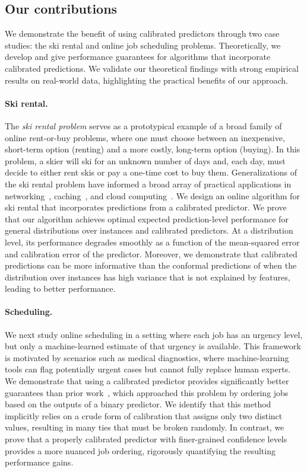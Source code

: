 \subsection{Our contributions}
We demonstrate the benefit of using calibrated predictors through two case studies: the ski rental and online job scheduling problems. Theoretically, we develop and give performance guarantees for algorithms that incorporate calibrated predictions. We validate our theoretical findings with strong empirical results on real-world data, highlighting the practical benefits of our approach.

\paragraph{Ski rental.}
The \emph{ski rental problem} serves as a prototypical example of a broad family of online rent-or-buy problems, where one must choose between an inexpensive, short-term option (renting) and a more costly, long-term option (buying). In this problem, a skier will ski for an unknown number of days and, each day, must decide to either rent skis or pay a one-time cost to buy them. Generalizations of the ski rental problem have informed a broad array of practical applications in networking~\citep{Karlin01:Dynamic}, caching~\citep{Karlin88:Competitive}, and cloud computing~\citep{Khanafer13:Constrained}. We design an online algorithm for ski rental that incorporates predictions from a calibrated predictor. We prove that our algorithm achieves optimal expected prediction-level performance for general distributions over instances and calibrated predictors. At a distribution level, its performance degrades smoothly as a function of the mean-squared error and calibration error of the predictor. Moreover, we demonstrate that calibrated predictions can be more informative than the conformal predictions of \citet{Sun24:Online} when the distribution over instances has high variance that is not explained by features, leading to better performance.
   
\paragraph{Scheduling.}
We next study online scheduling in a setting where each job has an urgency level, but only a machine-learned estimate of that urgency is available. This framework is motivated by scenarios such as medical diagnostics, where machine-learning tools can flag potentially urgent cases but cannot fully replace human experts. We demonstrate that using a calibrated predictor provides significantly better guarantees than prior work~\citep{Cho22:Scheduling}, which approached this problem by ordering jobs based on the outputs of a binary predictor. We identify that this method implicitly relies on a crude form of calibration that assigns only two distinct values, resulting in many ties that must be broken randomly. In contrast, we prove that a properly calibrated predictor with finer-grained confidence levels provides a more nuanced job ordering, rigorously quantifying the resulting performance gains.

